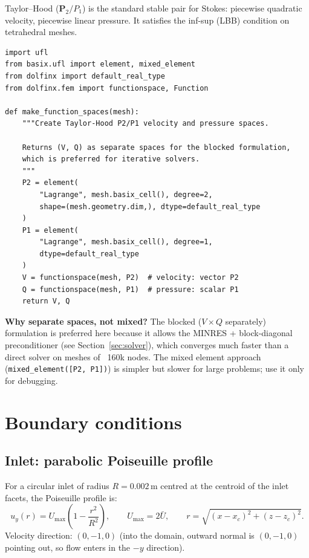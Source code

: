 \documentclass[11pt]{article}
\begin{document}
Taylor--Hood ($\mathbf{P}_2 / P_1$) is the standard stable pair for Stokes:
piecewise quadratic velocity, piecewise linear pressure. It satisfies the
inf-sup (LBB) condition on tetrahedral meshes.

\begin{lstlisting}
import ufl
from basix.ufl import element, mixed_element
from dolfinx import default_real_type
from dolfinx.fem import functionspace, Function

def make_function_spaces(mesh):
    """Create Taylor-Hood P2/P1 velocity and pressure spaces.

    Returns (V, Q) as separate spaces for the blocked formulation,
    which is preferred for iterative solvers.
    """
    P2 = element(
        "Lagrange", mesh.basix_cell(), degree=2,
        shape=(mesh.geometry.dim,), dtype=default_real_type
    )
    P1 = element(
        "Lagrange", mesh.basix_cell(), degree=1,
        dtype=default_real_type
    )
    V = functionspace(mesh, P2)  # velocity: vector P2
    Q = functionspace(mesh, P1)  # pressure: scalar P1
    return V, Q
\end{lstlisting}

\textbf{Why separate spaces, not mixed?} The blocked ($V \times Q$
separately) formulation is preferred here because it allows the MINRES +
block-diagonal preconditioner (see Section~\ref{sec:solver}), which
converges much faster than a direct solver on meshes of ~160k nodes.
The mixed element approach (\texttt{mixed\_element([P2, P1])}) is
simpler but slower for large problems; use it only for debugging.

\section{Boundary conditions}

\subsection*{Inlet: parabolic Poiseuille profile}

For a circular inlet of radius $R = 0.002\,\text{m}$ centred at the
centroid of the inlet facets, the Poiseuille profile is:
\[
  u_y(r) = U_{\max}\!\left(1 - \frac{r^2}{R^2}\right), \qquad
  U_{\max} = 2\bar{U}, \qquad
  r = \sqrt{(x - x_c)^2 + (z - z_c)^2}.
\]
Velocity direction: $(0, -1, 0)$ (into the domain, outward normal is
$(0, -1, 0)$ pointing out, so flow enters in the $-y$ direction).
\end{document}

